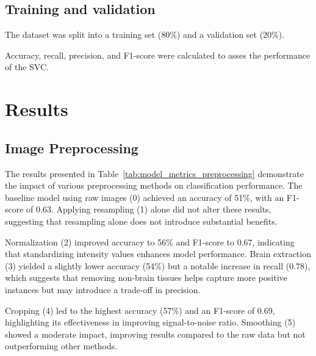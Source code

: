 %
\subsection{Training and validation}

The dataset was split into a training set (80\%) and a validation set (20\%). 

Accuracy, recall, precision, and F1-score were calculated to asses the performance of the SVC.

\section{Results}

\subsection{Image Preprocessing}

The results presented in Table~\ref{tab:model_metrics_preprocessing} demonstrate the impact of various preprocessing methods on classification performance. The baseline model using raw images (0) achieved an accuracy of 51\%, with an F1-score of 0.63. Applying resampling (1) alone did not alter these results, suggesting that resampling alone does not introduce substantial benefits.

Normalization (2) improved accuracy to 56\% and F1-score to 0.67, indicating that standardizing intensity values enhances model performance. Brain extraction (3) yielded a slightly lower accuracy (54\%) but a notable increase in recall (0.78), which suggests that removing non-brain tissues helps capture more positive instances but may introduce a trade-off in precision.

Cropping (4) led to the highest accuracy (57\%) and an F1-score of 0.69, highlighting its effectiveness in improving signal-to-noise ratio. Smoothing (5) showed a moderate impact, improving results compared to the raw data but not outperforming other methods.

